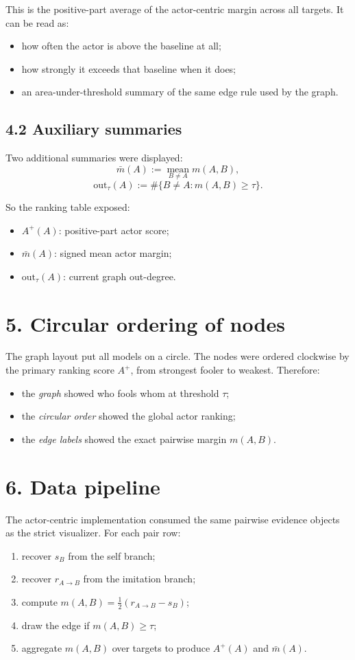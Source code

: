 \documentclass[11pt]{article}
\begin{document}
This is the positive-part average of the actor-centric margin across all targets. It can be read as:
\begin{itemize}
  \item how often the actor is above the baseline at all;
  \item how strongly it exceeds that baseline when it does;
  \item an area-under-threshold summary of the same edge rule used by the graph.
\end{itemize}

\subsection*{4.2 Auxiliary summaries}
Two additional summaries were displayed:
\[
\bar m(A)
:=
\operatorname*{mean}_{B\neq A} m(A,B),
\]
\[
\mathrm{out}_{\tau}(A)
:=
\#\{B\neq A : m(A,B)\ge \tau\}.
\]

So the ranking table exposed:
\begin{itemize}
  \item \(A^{+}(A)\): positive-part actor score;
  \item \(\bar m(A)\): signed mean actor margin;
  \item \(\mathrm{out}_{\tau}(A)\): current graph out-degree.
\end{itemize}

\section*{5. Circular ordering of nodes}
The graph layout put all models on a circle. The nodes were ordered clockwise by the primary ranking score \(A^{+}\), from strongest fooler to weakest. Therefore:
\begin{itemize}
  \item the \emph{graph} showed who fools whom at threshold \(\tau\);
  \item the \emph{circular order} showed the global actor ranking;
  \item the \emph{edge labels} showed the exact pairwise margin \(m(A,B)\).
\end{itemize}

\section*{6. Data pipeline}
The actor-centric implementation consumed the same pairwise evidence objects as the strict visualizer. For each pair row:
\begin{enumerate}
  \item recover \(s_B\) from the self branch;
  \item recover \(r_{A\to B}\) from the imitation branch;
  \item compute \(m(A,B)=\tfrac12(r_{A\to B}-s_B)\);
  \item draw the edge if \(m(A,B)\ge\tau\);
  \item aggregate \(m(A,B)\) over targets to produce \(A^{+}(A)\) and \(\bar m(A)\).
\end{enumerate}
\end{document}
